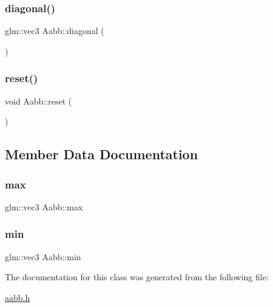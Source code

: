 \mbox{\label{class_aabb_a597f28309e6373c3fc3a52ead55bd1e1}} 
\subsubsection{\texorpdfstring{diagonal()}{diagonal()}}
{\footnotesize\ttfamily glm\+::vec3 Aabb\+::diagonal (\begin{DoxyParamCaption}{ }\end{DoxyParamCaption})\hspace{0.3cm}{\ttfamily [inline]}}

\mbox{\label{class_aabb_ab073c1ddcdb3286fc98bdbed961340a3}} 
\subsubsection{\texorpdfstring{reset()}{reset()}}
{\footnotesize\ttfamily void Aabb\+::reset (\begin{DoxyParamCaption}{ }\end{DoxyParamCaption})\hspace{0.3cm}{\ttfamily [inline]}}



\subsection{Member Data Documentation}
\mbox{\label{class_aabb_a4c29c5fabf6e182ede1fa963b745bba0}} 
\subsubsection{\texorpdfstring{max}{max}}
{\footnotesize\ttfamily glm\+::vec3 Aabb\+::max}

\mbox{\label{class_aabb_a7ec292dc1a179e674a6a826feefcfeea}} 
\subsubsection{\texorpdfstring{min}{min}}
{\footnotesize\ttfamily glm\+::vec3 Aabb\+::min}



The documentation for this class was generated from the following file\+:\begin{DoxyCompactItemize}
\item 
\mbox{\hyperlink{aabb_8h}{aabb.\+h}}\end{DoxyCompactItemize}
